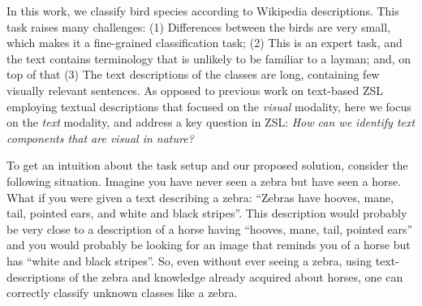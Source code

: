 \documentclass[11pt,a4paper]{article}
\newcommand\gal[1]{\textcolor{bright}{\textbf{GAL:} #1 }}
\newcommand\tzuf[1]{\textcolor{blue}{\textbf{TZUF:} #1 }}
\begin{document}
In this work, we classify bird species according to Wikipedia descriptions.
This task raises many challenges: 
(1) Differences between the birds are very small, which makes it a fine-grained classification task; (2) This is an expert task, %
and the text contains terminology that is unlikely to be familiar to a layman; and, on top of that
(3) The text descriptions of the classes are long, containing few visually relevant sentences. 
%
%
As opposed to previous work on text-based ZSL employing textual descriptions \citep{zhu2018generative,elhoseiny2017link} that focused on the {\em visual} modality, here we focus on the {\em text} modality, and address a key question in ZSL: \textit {How can we identify text components that are visual in nature?}


To get an intuition about the task setup and our proposed solution, consider the following situation.
Imagine you have never seen a zebra but have seen a horse. What if you were given a text describing a zebra: \enquote{Zebras have hooves, mane, tail, pointed ears, and white and black stripes}. This description would probably be very close to a description of a horse having \enquote{hooves, mane, tail, pointed ears} and you would probably be looking for an image that reminds you of a horse but has \enquote{white and black stripes}. So, even without ever seeing a zebra, using text-descriptions of the zebra and knowledge already acquired about horses, one can correctly classify unknown classes like a zebra.
\end{document}
